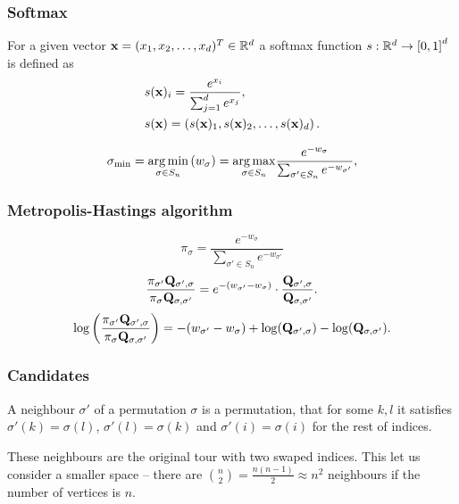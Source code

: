 \begin{frame}
	\frametitle{Softmax}
	\begin{definition}
		For a given vector $\mathbf{x} = (x_1, x_2, \ldots, x_d)^T \in \mathbb{R}^d$ a softmax function $s: \mathbb{R}^d \rightarrow \left[0, 1\right]^d$ is defined as
		\begin{align*}
		&s(\mathbf{x})_i = \frac{e^{x_i}}{\sum_{j=1}^{d} e^{x_j}}, \\
		&s(\mathbf{x}) = \left( s(\mathbf{x})_1, s(\mathbf{x})_2, \ldots, s(\mathbf{x})_d \right).
		\end{align*}
	\end{definition}
	\begin{equation*}
		\sigma_{\min} = \underset{\sigma \in S_n}{\operatorname*{arg\,min}} \left( w_{\sigma} \right) = \underset{\sigma \in S_n}{\operatorname*{arg\,max}} \frac{e^{-w_{\sigma}}}{\sum_{\sigma' \in S_n} e^{-w_{\sigma'}}},
	\end{equation*}
\end{frame}

\begin{frame}
	\frametitle{Metropolis-Hastings algorithm}
	\begin{equation*}
		\pi_\sigma = \frac{e^{-w_{\sigma}}}{\sum_{\sigma' \in S_n} e^{-w_{\sigma'}}}
	\end{equation*}
	\begin{equation*}
		\frac{\pi_{\sigma'} \mathbf{Q}_{\sigma',\sigma}}{\pi_\sigma \mathbf{Q}_{\sigma,\sigma'}} = e^{-(w_{\sigma'}-w_\sigma)} \cdot \frac{\mathbf{Q}_{\sigma',\sigma}}{\mathbf{Q}_{\sigma,\sigma'}}.
	\end{equation*}
	\begin{equation*}
		\log \left( \frac{\pi_{\sigma'} \mathbf{Q}_{\sigma',\sigma}}{\pi_\sigma \mathbf{Q}_{\sigma,\sigma'}} \right) = -(w_{\sigma'}-w_\sigma) + \log(\mathbf{Q}_{\sigma',\sigma}) - \log(\mathbf{Q}_{\sigma,\sigma'}).
	\end{equation*}
\end{frame}

\begin{frame}
	\frametitle{Candidates}
	\begin{definition}
		A neighbour $\sigma'$ of a permutation $\sigma$ is a permutation, that for some $k, l$ it satisfies $\sigma'(k) = \sigma(l)$, $\sigma'(l) = \sigma(k)$ and $\sigma'(i) = \sigma(i)$ for the rest of indices.
	\end{definition}
	These neighbours are the original tour with two swaped indices. This let  us consider a smaller space -- there are $\binom{n}{2} = \frac{n(n-1)}{2} \approx n^2$ neighbours if the number of vertices is $n$.
\end{frame}

